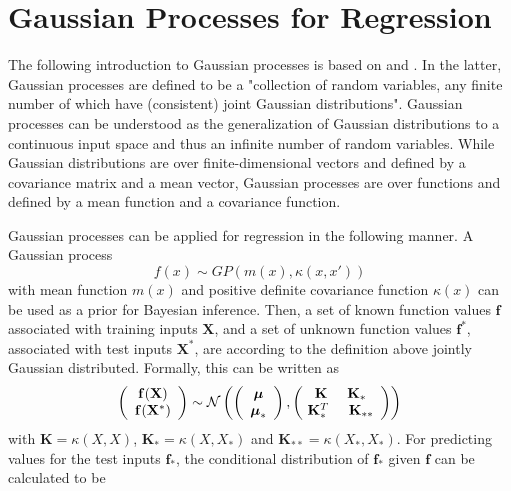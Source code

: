 \documentclass[../main.tex]{subfiles}
\begin{document}
\section{Gaussian Processes for Regression}
The following introduction to Gaussian processes is based on \cite{murphy2012machine} and \cite{rasmussen2006gaussian}. In the latter, Gaussian processes are defined to be a "collection of random variables, any finite number of which have (consistent) joint Gaussian distributions". Gaussian processes can be understood as the generalization of Gaussian distributions to a continuous input space and thus an infinite number of random variables. While Gaussian distributions are over finite-dimensional vectors and defined by a covariance matrix and a mean vector, Gaussian processes are over functions and defined by a mean function and a covariance function.\par
Gaussian processes can be applied for regression in the following manner. A Gaussian process 
\begin{equation}
    f(x) \sim GP(m(x),\kappa(x,x'))
\end{equation}
with mean function $m(x)$ and positive definite covariance function $\kappa(x)$ can be used as a prior for Bayesian inference. Then, a set of known function values $\mathbf{f}$ associated with training inputs $\mathbf{X}$, and a set of unknown function values $\mathbf{f^*}$, associated with test inputs $\mathbf{X^*}$, are according to the definition above jointly Gaussian distributed. Formally, this can be written as
\begin{equation}
    \left(
    \begin{array}{c}
      \mathbf{f(\mathbf{X})} \\\mathbf{f(\mathbf{X^*})}
    \end{array}
 \right) \sim \mathcal{N}
 \left(\left( 
  \begin{array}{c}
  \boldsymbol{\mu} \\ \boldsymbol{\mu}_* 
  \end{array}
  \right),
  \left(\!
  \begin{array}{c}
  \mathbf{K} \hspace{0.5cm} \mathbf{K}_* \\
  \mathbf{K}^T_* \hspace{0.5cm} \mathbf{K}_{**}  
  \end{array}
  \right)
  \right)
\end{equation}
with $\mathbf{K} = \kappa(X,X)$, $\mathbf{K_*} = \kappa(X,X_*)$ and $\mathbf{K_{**}} = \kappa(X_*,X_*)$. For predicting values for the test inputs $\mathbf{f}_*$, the conditional distribution of $\mathbf{f}_*$ given $\mathbf{f}$ can be calculated to be
\end{document}
